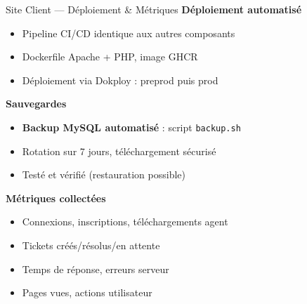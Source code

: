 \documentclass[xcolor=dvipsnames, aspectratio=169, 10pt]{beamer}
\newcommand{\bitem}{\item[$\bullet$]}
\begin{document}
\begin{frame}{Site Client — Déploiement \& Métriques}
  \textbf{Déploiement automatisé}
  \begin{itemize}
    \bitem Pipeline CI/CD identique aux autres composants
    \bitem Dockerfile Apache + PHP, image GHCR
    \bitem Déploiement via Dokploy : preprod puis prod
  \end{itemize}
  \vspace{0.2cm}
  \textbf{Sauvegardes}
  \begin{itemize}
    \bitem \textbf{Backup MySQL automatisé} : script \texttt{backup.sh}
    \bitem Rotation sur 7 jours, téléchargement sécurisé
    \bitem Testé et vérifié (restauration possible)
  \end{itemize}
  \vspace{0.2cm}
  \textbf{Métriques collectées}
  \begin{itemize}
    \bitem Connexions, inscriptions, téléchargements agent
    \bitem Tickets créés/résolus/en attente
    \bitem Temps de réponse, erreurs serveur
    \bitem Pages vues, actions utilisateur
  \end{itemize}
\end{frame}
\end{document}
